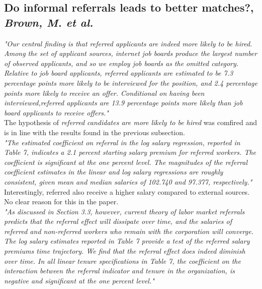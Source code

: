 \documentclass[a4paper, 11pt]{article} %
\begin{document}
\subsection*{Do informal referrals leads to better matches?, \emph{Brown, M. et al.} \cite{fifth}}

\emph{"Our central finding is that referred applicants are indeed more likely to be hired. Among the
set of applicant sources, internet job boards produce the largest number of observed applicants,
and so we employ job boards as the omitted category. Relative to job board applicants, referred
applicants are estimated to be 7.3 percentage points more likely to be interviewed for the position,
and 2.4 percentage points more likely to receive an offer. Conditional on having been interviewed,referred applicants are 13.9 percentage points more likely than job board applicants to receive
offers."}\\

The hypothesis of \emph{referred candidates are more likely to be hired} was comfired and is in line with the results found in the previous subsection.\\

\emph{"The estimated coefficient on referral in the log salary regression, reported in Table 7, indicates
a 2.1 percent starting salary premium for referred workers. The coefficient is significant at the
one percent level. The magnitudes of the referral coefficient estimates in the linear and log salary
regressions are roughly consistent, given mean and median salaries of 102.740 and 97.377, respectively."}\\

Interestingly, referred also receive a higher salary compared to external sources. No clear reason for this in the paper.\\

\emph{"As discussed in Section 3.3, however, current theory of labor market referrals predicts that the
referral effect will dissipate over time, and the salaries of referred and non-referred workers who
remain with the corporation will converge. The log salary estimates reported in Table 7 provide a
test of the referred salary premiums time trajectory.
We find that the referral effect does indeed diminish over time. In all linear tenure specifications
in Table 7, the coefficient on the interaction between the referral indicator and tenure in the
organization, is negative and significant at the one percent level."}\\
\end{document}
